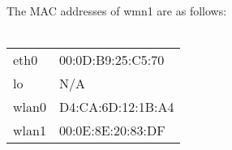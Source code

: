 The MAC addresses of wmn1 are as follows: \\ \\
\begin{tabular}{ll}
eth0 & 00:0D:B9:25:C5:70\\
lo & N/A\\
wlan0 & D4:CA:6D:12:1B:A4\\
wlan1 & 00:0E:8E:20:83:DF\\
\end{tabular}
